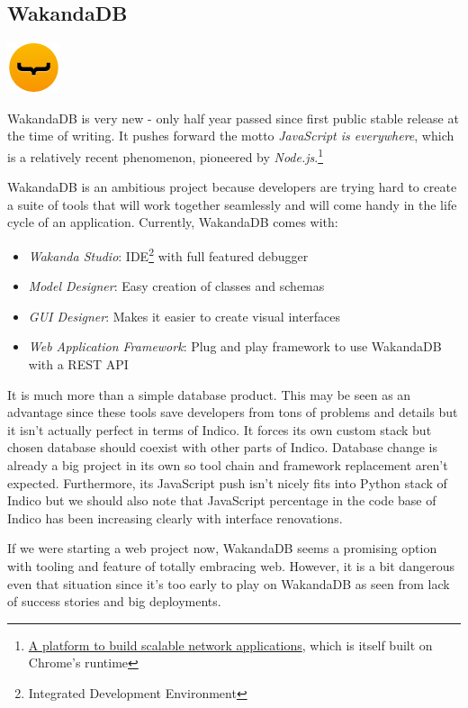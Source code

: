 \subsection{WakandaDB}

\vspace{-1.15cm} \hspace{4.1cm} \includegraphics[scale=0.8]{3/figures/wakandadb.png}

WakandaDB is very new - only half year passed since first public stable release at the time of writing. It pushes forward the motto \textit{JavaScript is everywhere}, which is a relatively recent phenomenon, pioneered by \textit{Node.js}.\footnote{\href{http://nodejs.org/}{A platform to build scalable network applications}, which is itself built on Chrome's runtime}

WakandaDB is an ambitious project because developers are trying hard to create a suite of tools that will work together seamlessly and will come handy in the life cycle of an application. Currently, WakandaDB comes with:
\begin{itemize}
  \item \textit{Wakanda Studio}: IDE\footnote{Integrated Development Environment} with full featured debugger
  \item \textit{Model Designer}: Easy creation of classes and schemas
  \item \textit{GUI Designer}: Makes it easier to create visual interfaces
  \item \textit{Web Application Framework}: Plug and play framework to use WakandaDB with a REST API
\end{itemize}

It is much more than a simple database product. This may be seen as an advantage since these tools save developers from tons of problems and details but it isn't actually perfect in terms of Indico. It forces its own custom stack but chosen database should coexist with other parts of Indico. Database change is already a big project in its own so tool chain and framework replacement aren't expected. Furthermore, its JavaScript push isn't nicely fits into Python stack of Indico but we should also note that JavaScript percentage in the code base of Indico has been increasing clearly with interface renovations.

If we were starting a web project now, WakandaDB seems a promising option with tooling and feature of totally embracing web. However, it is a bit dangerous even that situation since it's too early to play on WakandaDB as seen from lack of success stories and big deployments.

